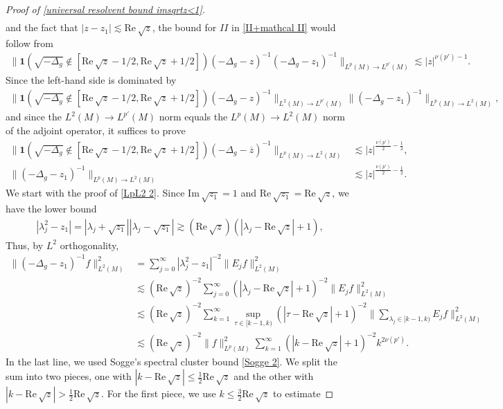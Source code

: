 \documentclass[12pt]{amsart}
\newcommand\re{\mathrm{Re}\,}
\newcommand\im{\mathrm{Im}\,}
\begin{document}
\begin{proof}[Proof of \eqref{universal resolvent bound imsqrtz<1}]
\begin{align}
\end{align}
and the fact that $|z-z_1|\lesssim\re\sqrt{z}$, the bound for $II$ in \eqref{II+mathcal II} would follow from
\begin{align}
 \|\mathbf{1}(\sqrt{-\Delta_g}\notin [\re\sqrt{z}-1/2,\re\sqrt{z}+1/2])(-\Delta_g-z)^{-1}(-\Delta_g-z_1)^{-1}\|_{L^{p}(M)\to L^{p'}(M)}\lesssim |z|^{\nu(p')-1}. 
\end{align}
Since the left-hand side is dominated by 
\begin{align}
    \|\mathbf{1}(\sqrt{-\Delta_g}\notin [\re\sqrt{z}-1/2,\re\sqrt{z}+1/2])(-\Delta_g-z)^{-1}\|_{L^{2}(M)\to L^{p'}(M)}\|(-\Delta_g-z_1)^{-1}\|_{L^{p}(M)\to L^{2}(M)},
\end{align}
and since the $L^{2}(M)\to L^{p'}(M)$ norm equals the $L^{p}(M)\to L^{2}(M)$ norm of the adjoint operator, it suffices to prove
\begin{align}
 \|\mathbf{1}(\sqrt{-\Delta_g}\notin [\re\sqrt{z}-1/2,\re\sqrt{z}+1/2])(-\Delta_g-\overline{z})^{-1}\|_{L^{p}(M)\to L^{2}(M)}&\lesssim |z|^{\frac{\nu(p')}{2}-\frac{1}{2}},\label{LpL2 1}\\
 \|(-\Delta_g-z_1)^{-1}\|_{L^{p}(M)\to L^{2}(M)}&\lesssim |z|^{\frac{\nu(p')}{2}-\frac{1}{2}}\label{LpL2 2}.
\end{align}
We start with the proof of \eqref{LpL2 2}. Since $\im\sqrt{z_1}=1$ and $\re\sqrt{z_1}=\re\sqrt{z}$, we have the lower bound
\begin{align}
    |\lambda_j^2-z_1|=|\lambda_j+\sqrt{z_1}||\lambda_j-\sqrt{z_1}|\gtrsim (\re\sqrt{z})(|\lambda_j-\re\sqrt{z}|+1),
\end{align}
Thus, by $L^2$ orthogonality,
\begin{align}
\|(-\Delta_g-z_1)^{-1}f\|_{L^{2}(M)}^2&=\sum_{j=0}^{\infty}|\lambda_j^2-z_1|^{-2}\|E_jf\|_{L^{2}(M)}^2\\    
&\lesssim(\re\sqrt{z})^{-2}\sum_{j=0}^{\infty}(|\lambda_j-\re\sqrt{z}|+1)^{-2}\|E_jf\|_{L^{2}(M)}^2\\
&\lesssim(\re\sqrt{z})^{-2}\sum_{k=1}^{\infty}\sup_{\tau\in[k-1,k)}(|\tau-\re\sqrt{z}|+1)^{-2}\|\sum_{\lambda_j\in [k-1,k)}E_jf\|_{L^{2}(M)}^2\\
&\lesssim (\re\sqrt{z})^{-2}\|f\|_{L^{p}(M)}^2\sum_{k=1}^{\infty}(|k-\re\sqrt{z}|+1)^{-2}k^{2\nu(p')}.
\end{align}
In the last line, we used Sogge's spectral cluster bound \eqref{Sogge 2}. 
We split the sum into two pieces, one with $|k-\re\sqrt{z}|\leq \frac{1}{2}\re\sqrt{z}$ and the other with $|k-\re\sqrt{z}|> \frac{1}{2}\re\sqrt{z}$. For the first piece, we use $k\leq \frac{3}{2}\re\sqrt{z}$ to estimate

\end{proof}
\end{document}
